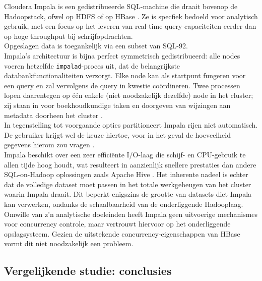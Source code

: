 Cloudera Impala is een gedistribueerde SQL-machine die draait bovenop de Hadoopstack, ofwel op HDFS of op HBase \cite{cloudera_impala}. Ze is specfiek bedoeld voor analytisch gebruik, met een focus op het leveren van real-time query-capaciteiten eerder dan op hoge throughput bij schrijfopdrachten.\\
Opgeslagen data is toegankelijk via een subset van SQL-92.\\
Impala's architectuur is bijna perfect symmetrisch gedistribueerd: alle nodes voeren hetzelfde \texttt{impalad}-proces uit, dat de belangrijkste databankfunctionaliteiten verzorgt. Elke node kan als startpunt fungeren voor een query en zal vervolgens de query in kwestie co\"ordineren. Twee processen lopen daarentegen op \'e\'en enkele (niet noodzakelijk dezelfde) node in het cluster; zij staan in voor boekhoudkundige taken en doorgeven van wijzingen aan metadata doorheen het cluster \cite{impala_components}.\\
In tegenstelling tot voorgaande opties partitioneert Impala rijen niet automatisch. De gebruiker krijgt wel de keuze hiertoe, voor in het geval de hoeveelheid gegevens hierom zou vragen \cite{impala_partitioning}.\\
Impala beschikt over een zeer effici\"ente I/O-laag die schijf- en CPU-gebruik te allen tijde hoog houdt, wat resulteert in aanzienlijk snellere prestaties dan andere SQL-on-Hadoop oplossingen zoals Apache Hive \cite{floratou2014sql}. Het inherente nadeel is echter dat de volledige dataset moet passen in het totale werkgeheugen van het cluster waarin Impala draait. Dit beperkt enigszins de grootte van datasets diet Impala kan verwerken, ondanks de schaalbaarheid van de onderliggende Hadooplaag.\\
Omwille van z'n analytische doeleinden heeft Impala geen uitvoerige mechanismes voor concurrency controle, maar vertrouwt hiervoor op het onderliggende opslagsysteem. Gezien de uitstekende concurrency-eigenschappen van HBase vormt dit niet noodzakelijk een probleem.

\subsection{Vergelijkende studie: conclusies}

